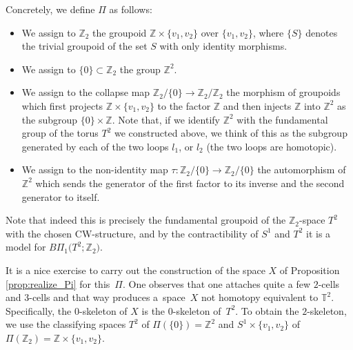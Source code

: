 \documentclass[pdftex]{sigma}
\numberwithin{equation}{section}
\def\ZZ{\ensuremath{\mathbb{Z}}}
\begin{document}
\begin{Example}
		Concretely, we define $\Pi$ as follows:
		\begin{itemize}\itemsep=0pt
			\item We assign to $\ZZ_2$ the groupoid $\ZZ\times
			\{v_1,v_2\}$ over $\{v_1,v_2\}$, where $\{S\}$ denotes the trivial groupoid of
			the set $S$ with only identity morphisms.
			\item We assign to $\{0\}\subset \ZZ_2$ the group $\ZZ^2$.
			\item We assign to the collapse map $\ZZ_2/\{0\}\to \ZZ_2/\ZZ_2$ the morphism
			of groupoids which first projects $\ZZ\times \{v_1,v_2\}$ to the factor
			$\ZZ$ and then injects $\ZZ$ into $\ZZ^2$ as the subgroup $\{0\}\times
			\ZZ$. Note that, if we identify $\ZZ^2$ with the fundamental group of the
			torus $T^2$ we constructed above, we think of this as the subgroup generated
			by each of the two loops $l_1$, or $l_2$ (the two loops are homotopic).
			\item We assign to the non-identity map $\tau\colon \ZZ_2/\{0\}\to \ZZ_2/\{0\}$
			the automorphism of $\ZZ^2$ which sends the generator of the first factor
			to its inverse and the second generator to itself.
		\end{itemize}
		
		Note that indeed this is precisely the fundamental groupoid of the
		$\ZZ_2$-space $T^2$ with the chosen CW-structure, and by the contractibility
		of $S^1$ and $T^2$ it is a model for $B\Pi_1\bigl(T^2;\ZZ_2\bigr)$.
		
		It is a nice exercise to carry out the construction of the space $X$ of
		Proposition
		\ref{prop:realize_Pi} for this~$\Pi$. One observes that one attaches quite
		a few $2$-cells and $3$-cells and that way produces a~space~$X$ not homotopy equivalent to $\mathbb{T}^2$. Specifically,
		the $0$-skeleton of $X$ is the $0$-skeleton of~$T^2$. To obtain the
		$2$-skeleton, we use the classifying spaces $T^2$ of $\Pi(\{0\})=\ZZ^2$ and
		$S^1\times \{v_1,v_2\}$ of~${\Pi(\ZZ_2)=\ZZ\times \{v_1,v_2\}}$.
		

\end{Example}
\end{document}
